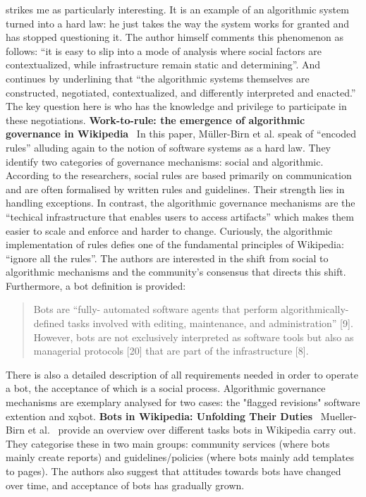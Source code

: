 \documentclass[pdftex,a4paper,11pt]{scrartcl}
\begin{document}
strikes me as particularly interesting.
It is an example of an algorithmic system turned into a hard law: he just takes the way the system works for granted and has stopped questioning it.
The author himself comments this phenomenon as follows:
``it is easy to slip into a mode of analysis where social factors are contextualized, while infrastructure remain static and determining''.
And continues by underlining that ``the algorithmic systems themselves are constructed, negotiated, contextualized, and differently interpreted and enacted.''
The key question here is who has the knowledge and privilege to participate in these negotiations.
\newline
\newline
\textbf{Work-to-rule: the emergence of algorithmic governance in Wikipedia}~\cite{MueDoHer2013}
\newline
\newline
In this paper, Müller-Birn et al. speak of ``encoded rules'' alluding again to the notion of software systems as a hard law.
They identify two categories of governance mechanisms: social and algorithmic.
According to the researchers, social rules are based primarily on communication and are often formalised by written rules and guidelines.
Their strength lies in handling exceptions.
In contrast, the algorithmic governance mechanisms are the ``techical infrastructure that enables users to access artifacts'' which makes them easier to scale and enforce and harder to change.
Curiously, the algorithmic implementation of rules defies one of the fundamental principles of Wikipedia: ``ignore all the rules''.
The authors are interested in the shift from social to algorithmic mechanisms and the community's consensus that directs this shift.
Furthermore, a bot definition is provided:
\begin{quotation}
Bots are ``fully-
automated software agents that perform algorithmically-defined tasks
involved with editing, maintenance, and administration'' [9]. However, bots are not exclusively interpreted as software tools but also
as managerial protocols [20] that are part of the infrastructure [8].
\end{quotation}
There is also a detailed description of all requirements needed in order to operate a bot, the acceptance of which is a social process.
Algorithmic governance mechanisms are exemplary analysed for two cases: the "flagged revisions" software extention and xqbot.
\newline
\newline
\textbf{Bots in Wikipedia: Unfolding Their Duties}~\cite{MuellerBirn2014}
\newline
\newline
Mueller-Birn et al.~\cite{MuellerBirn2014} provide an overview over different tasks bots in Wikipedia carry out.
They categorise these in two main groups: community services (where bots mainly create reports) and guidelines/policies (where bots mainly add templates to pages).
The authors also suggest that attitudes towards bots have changed over time, and acceptance of bots has gradually grown.
\end{document}
